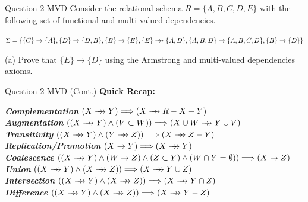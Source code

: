 \begin{frame}[fragile]{Question 2 MVD}
Consider the relational schema $R = \{A,B,C,D,E\}$ with the following set of functional and multi-valued dependencies.\\ \vspace{5pt}

$\Sigma=\{\{C\}\rightarrow\{A\}, \{D\}\rightarrow\{D,B\}, \{B\}\rightarrow\{E\},\{E\}\mbox{$\; \rightarrow \! \! \! \! \rightarrow \; $}\{A,D\},\{A,B,D\}\rightarrow\{A,B,C,D\},\{B\}\rightarrow\{D\}\}$\\ \vspace{5pt}

(a) Prove that $\{E\}\rightarrow\{D\}$ using the Armstrong and multi-valued dependencies axioms.\\ \vspace{5pt}

\end{frame}
\begin{frame}[fragile]{Question 2 MVD (Cont.)}
	\textbf{\underline{Quick Recap:}}\\\vspace{20pt}
	\begin{small}
	\textbf{\textit{Complementation}} $\left( X\mvd Y \right) \Longrightarrow \left( X\mvd R-X-Y \right) $
	 \\\vspace{5pt}
	\textbf{\textit{Augmentation}} $\left( \left( X\mvd Y \right) \land \left( V\subset W \right) \right) \Longrightarrow \left( X\cup W\mvd Y\cup V \right) $
	\\\vspace{5pt}
	\textbf{\textit{Transitivity}} $\left( \left( X\mvd Y \right) \land \left( Y\mvd Z \right) \right) \Longrightarrow \left( X\mvd Z-Y \right) 
	$\\\vspace{5pt}
	\textbf{\textit{Replication/Promotion}} $\left( X\rightarrow Y \right) \Longrightarrow \left( X\mbox{$\; \rightarrow \! \! \! \! \rightarrow \; $} Y \right) $ \\\vspace{5pt}
	\textbf{\textit{Coalescence}} $\left( \left( X\mbox{$\; \rightarrow \! \! \! \! \rightarrow \; $} Y \right) \land \left( W\rightarrow Z \right) \land \left( Z\subset Y \right) \land \left( W\cap Y=\emptyset \right) \right) \Longrightarrow \left( X\rightarrow Z \right) $ \\\vspace{5pt}
	\textbf{\textit{Union}} $\left( \left( X\mvd Y \right) \land \left( X\mvd Z \right) \right) \Longrightarrow \left( X\mvd Y\cup Z \right) $ \\\vspace{5pt}
	\textbf{\textit{Intersection}} $\left( \left( X\mvd Y \right) \land \left( X\mvd Z \right) \right) \Longrightarrow \left( X\mvd Y\cap Z \right) $ \\\vspace{5pt}
	\textbf{\textit{Difference}} $\left( \left( X\mvd Y \right) \land \left( X\mvd Z \right) \right) \Longrightarrow \left( X\mvd Y-Z \right) $ \\\vspace{5pt}
	\end{small}

\end{frame}
